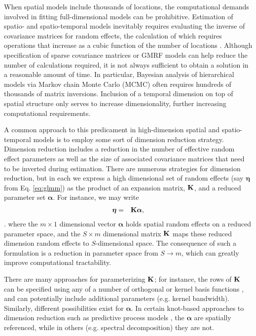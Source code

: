 \documentclass[12pt,english]{article}
\begin{document}
\begin{spacing}{1.9}
When spatial models include thousands of locations, the computational demands involved in fitting full-dimensional models can be prohibitive.  Estimation of spatio- and spatio-temporal models inevitably requires
evaluating the inverse of covariance matrices for random effects, the calculation of which requires operations that increase as a cubic function of the number of locations \citep{Wikle2010}.  Although specification of sparse covariance matrices or GMRF models can help reduce the number of calculations required, it is not always sufficient to obtain a solution in a reasonable amount of time.  In particular, Bayesian analysis of
hierarchical models via Markov chain Monte Carlo (MCMC) often requires hundreds of thousands of matrix inversions.  Inclusion of a temporal dimension on top of spatial structure only serves to increase dimensionality, further increasing computational requirements.

A common approach to this predicament in high-dimension spatial and spatio-temporal models is to employ some sort of dimension reduction strategy. Dimension reduction includes a reduction in the number of effective random effect parameters as well as the size of associated covariance matrices that need to be inverted during estimation.  There are numerous strategies for dimension reduction, but in each we express a high dimensional set of random effects (say $\boldsymbol{\eta}$ from Eq. \ref{eq:glmm}) as the product of an expansion matrix, ${\bf K}$, and a reduced parameter set $\boldsymbol{\alpha}$.  For instance, we may write
\begin{eqnarray}
   \boldsymbol{\eta} & = & {\bf K} \boldsymbol{\alpha},
   \label{eq:reduced-spat}
\end{eqnarray}.
where the $m \times 1$ dimensional vector $\boldsymbol{\alpha}$ holds spatial random effects on a reduced parameter space,  and the $S \times m$ dimensional matrix ${\bf K}$ maps these reduced dimension random effects to $S$-dimensional space.  The consequence of such a formulation is a reduction in parameter space from $S \rightarrow m$, which can greatly improve computational tractability.

There are many approaches for parameterizing ${\bf K}$; for instance, the rows of ${\bf K}$ can be specified using any of a number of orthogonal or kernel basis functions \citep{Wikle2010}, and can potentially include additional parameters (e.g. kernel bandwidth).  Similarly, different possibilities exist for $\boldsymbol{\alpha}$.  In certain knot-based approaches to dimension reduction such as predictive process models \citep{BanerjeeEtAl2008}, the $\boldsymbol{\alpha}$ are spatially referenced, while in others (e.g. spectral decomposition) they are not.


\end{spacing}
\end{document}

